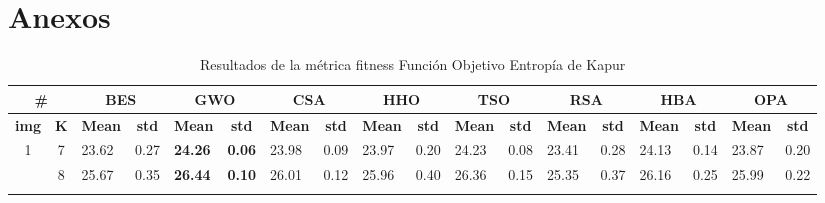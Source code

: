 \documentclass[conference]{IEEEtran}
\begin{document}
\section{Anexos}
\vspace*{-10pt}
\begin{table}[t]
	\caption{Resultados de la métrica fitness Función Objetivo Entropía de Kapur}
	\begin{tabular}{|cc|ll|ll|ll|ll|ll|ll|ll|ll|}
		\hline
		\multicolumn{2}{|c|}{\textbf{\#}} & \multicolumn{2}{c|}{\textbf{BES}} & \multicolumn{2}{c|}{\textbf{GWO}} & \multicolumn{2}{c|}{\textbf{CSA}} & \multicolumn{2}{c|}{\textbf{HHO}} & \multicolumn{2}{c|}{\textbf{TSO}} & \multicolumn{2}{c|}{\textbf{RSA}} & \multicolumn{2}{c|}{\textbf{HBA}} & \multicolumn{2}{c|}{\textbf{OPA}} \\ \hline
		\multicolumn{1}{|c|}{\textbf{img}}        & \textbf{K} & \multicolumn{1}{c|}{\textbf{Mean}} & \multicolumn{1}{c|}{\textbf{std}} & \multicolumn{1}{c|}{\textbf{Mean}}  & \multicolumn{1}{c|}{\textbf{std}} & \multicolumn{1}{c|}{\textbf{Mean}} & \multicolumn{1}{c|}{\textbf{std}} & \multicolumn{1}{c|}{\textbf{Mean}} & \multicolumn{1}{c|}{\textbf{std}} & \multicolumn{1}{c|}{\textbf{Mean}}        & \multicolumn{1}{c|}{\textbf{std}} & \multicolumn{1}{c|}{\textbf{Mean}} & \multicolumn{1}{c|}{\textbf{std}} & \multicolumn{1}{c|}{\textbf{Mean}}  & \multicolumn{1}{c|}{\textbf{std}} & \multicolumn{1}{c|}{\textbf{Mean}} & \multicolumn{1}{c|}{\textbf{std}} \\ \hline
		\multicolumn{1}{|c|}{\multirow{3}{*}{1}}  & 7          & \multicolumn{1}{l|}{23.62}         & 0.27                              & \multicolumn{1}{l|}{\textbf{24.26}} & \textbf{0.06}                     & \multicolumn{1}{l|}{23.98}         & 0.09                              & \multicolumn{1}{l|}{23.97}         & 0.20                              & \multicolumn{1}{l|}{24.23}                & 0.08          & \multicolumn{1}{l|}{23.41} & 0.28 & \multicolumn{1}{l|}{24.13}          & 0.14          & \multicolumn{1}{l|}{23.87} & 0.20 \\ \cline{2-18} 
		\multicolumn{1}{|c|}{}                    & 8          & \multicolumn{1}{l|}{25.67}         & 0.35                              & \multicolumn{1}{l|}{\textbf{26.44}} & \textbf{0.10}                     & \multicolumn{1}{l|}{26.01}         & 0.12                              & \multicolumn{1}{l|}{25.96}         & 0.40                              & \multicolumn{1}{l|}{26.36}                & 0.15          & \multicolumn{1}{l|}{25.35} & 0.37 & \multicolumn{1}{l|}{26.16}          & 0.25          & \multicolumn{1}{l|}{25.99} & 0.22 \\ \cline{2-18} 

\end{tabular}
\end{table}
\end{document}
